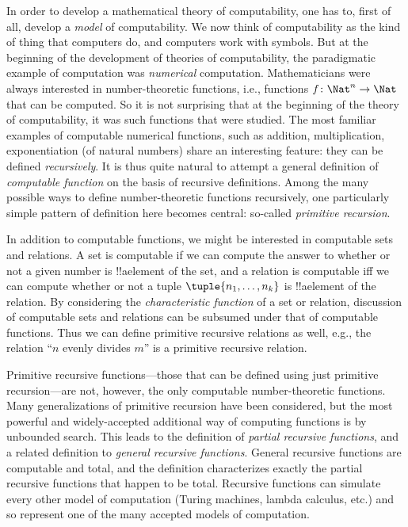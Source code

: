 \documentclass[../../../include/open-logic-section]{subfiles}
\begin{document}

In order to develop a mathematical theory of computability, one has to,
first of all, develop a \emph{model} of computability.  We now think of
computability as the kind of thing that computers do, and computers
work with symbols.  But at the beginning of the development of
theories of computability, the paradigmatic example of computation was
\emph{numerical} computation.  Mathematicians were always interested
in number-theoretic functions, i.e., functions $f\colon \Nat^n \to
\Nat$ that can be computed. So it is not surprising that at the
beginning of the theory of computability, it was such functions that
were studied.  The most familiar examples of computable numerical
functions, such as addition, multiplication, exponentiation (of
natural numbers) share an interesting feature: they can be defined
\emph{recursively}.  It is thus quite natural to attempt a general
definition of \emph{computable function} on the basis of recursive
definitions.  Among the many possible ways to define number-theoretic
functions recursively, one particularly simple pattern of definition
here becomes central: so-called \emph{primitive recursion}.

In addition to computable functions, we might be interested in
computable sets and relations. A set is computable if we can compute
the answer to whether or not a given number is !!a{element} of the
set, and a relation is computable iff we can compute whether or not a
tuple $\tuple{n_1, \dots, n_k}$ is !!a{element} of the relation.  By
considering the \emph{characteristic function} of a set or relation,
discussion of computable sets and relations can be subsumed under that
of computable functions.  Thus we can define primitive recursive
relations as well, e.g., the relation ``$n$ evenly divides $m$'' is a
primitive recursive relation.

Primitive recursive functions---those that can be defined using just
primitive recursion---are not, however, the only computable
number-theoretic functions. Many generalizations of primitive
recursion have been considered, but the most powerful and
widely-accepted additional way of computing functions is by unbounded
search.  This leads to the definition of \emph{partial recursive
  functions}, and a related definition to \emph{general recursive
  functions}.  General recursive functions are computable and total,
and the definition characterizes exactly the partial recursive
functions that happen to be total.  Recursive functions can simulate
every other model of computation (Turing machines, lambda calculus,
etc.) and so represent one of the many accepted models of computation.
\end{document}
